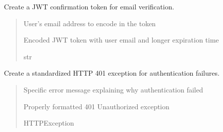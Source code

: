 \documentclass[letterpaper,10pt,openany,oneside,english]{sphinxmanual}
\begin{document}

\begin{savenotes}\begin{fulllineitems}
\label{\detokenize{modules/security:storeapi.security.create_confirmation_token}}
\pysigstartsignatures
{}
\pysigstopsignatures
\sphinxAtStartPar
Create a JWT confirmation token for email verification.
\begin{quote}\begin{description}
\sphinxAtStartPar
{} \textendash{} User’s email address to encode in the token

\sphinxAtStartPar
Encoded JWT token with user email and longer expiration time

\sphinxAtStartPar
str

\end{description}\end{quote}

\end{fulllineitems}\end{savenotes}


\begin{savenotes}\begin{fulllineitems}
\label{\detokenize{modules/security:storeapi.security.create_credentials_exception}}
\pysigstartsignatures
{}
\pysigstopsignatures
\sphinxAtStartPar
Create a standardized HTTP 401 exception for authentication failures.
\begin{quote}\begin{description}
\sphinxAtStartPar
{} \textendash{} Specific error message explaining why authentication failed

\sphinxAtStartPar
Properly formatted 401 Unauthorized exception

\sphinxAtStartPar
HTTPException

\end{description}\end{quote}

\end{fulllineitems}\end{savenotes}
\end{document}
